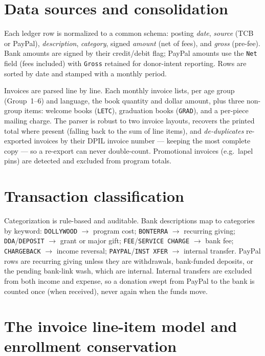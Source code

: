 \section{Data sources and consolidation}

Each ledger row is normalized to a common schema: posting \emph{date}, \emph{source}
(TCB or PayPal), \emph{description}, \emph{category}, signed \emph{amount} (net of
fees), and \emph{gross} (pre-fee). Bank amounts are signed by their credit/debit
flag; PayPal amounts use the \texttt{Net} field (fees included) with \texttt{Gross}
retained for donor-intent reporting. Rows are sorted by date and stamped with a
monthly period.

Invoices are parsed line by line. Each monthly invoice lists, per age group
(Group~1--6) and language, the book quantity and dollar amount, plus three
non-group items: welcome books (\texttt{LETC}), graduation books (\texttt{GRAD}),
and a per-piece mailing charge. The parser is robust to two invoice layouts,
recovers the printed total where present (falling back to the sum of line items),
and \emph{de-duplicates} re-exported invoices by their DPIL invoice number ---
keeping the most complete copy --- so a re-export can never double-count.
Promotional invoices (e.g.\ lapel pins) are detected and excluded from program
totals.

\section{Transaction classification}

Categorization is rule-based and auditable. Bank descriptions map to categories by
keyword: \texttt{DOLLYWOOD} $\rightarrow$ program cost; \texttt{BONTERRA}
$\rightarrow$ recurring giving; \texttt{DDA}/\texttt{DEPOSIT} $\rightarrow$ grant or
major gift; \texttt{FEE}/\texttt{SERVICE CHARGE} $\rightarrow$ bank fee;
\texttt{CHARGEBACK} $\rightarrow$ income reversal; \texttt{PAYPAL}/\texttt{INST XFER}
$\rightarrow$ internal transfer. PayPal rows are recurring giving unless they are
withdrawals, bank-funded deposits, or the pending bank-link wash, which are
internal. Internal transfers are excluded from both income and expense, so a
donation swept from PayPal to the bank is counted once (when received), never again
when the funds move.

\section{The invoice line-item model and enrollment conservation}

